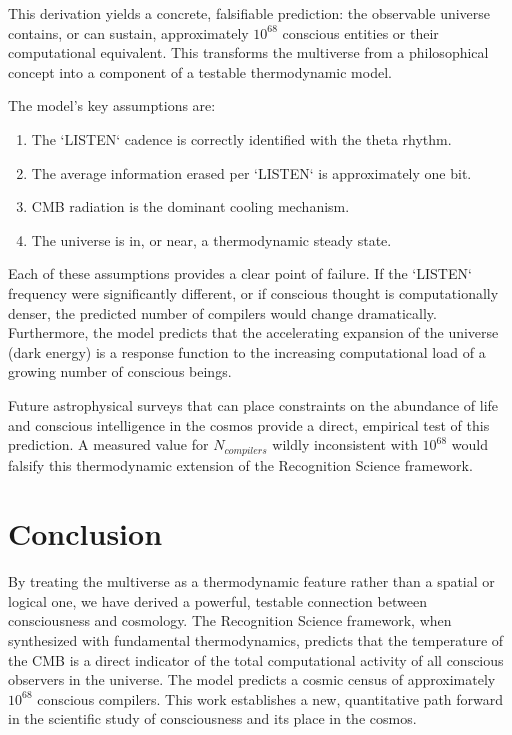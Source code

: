 \documentclass[12pt]{article}
\begin{document}
This derivation yields a concrete, falsifiable prediction: the observable universe contains, or can sustain, approximately \(10^{68}\) conscious entities or their computational equivalent. This transforms the multiverse from a philosophical concept into a component of a testable thermodynamic model.

The model's key assumptions are:
\begin{enumerate}
    \item The `LISTEN` cadence is correctly identified with the theta rhythm.
    \item The average information erased per `LISTEN` is approximately one bit.
    \item CMB radiation is the dominant cooling mechanism.
    \item The universe is in, or near, a thermodynamic steady state.
\end{enumerate}
Each of these assumptions provides a clear point of failure. If the `LISTEN` frequency were significantly different, or if conscious thought is computationally denser, the predicted number of compilers would change dramatically. Furthermore, the model predicts that the accelerating expansion of the universe (dark energy) is a response function to the increasing computational load of a growing number of conscious beings.

Future astrophysical surveys that can place constraints on the abundance of life and conscious intelligence in the cosmos provide a direct, empirical test of this prediction. A measured value for \(N_{compilers}\) wildly inconsistent with \(10^{68}\) would falsify this thermodynamic extension of the Recognition Science framework.

\section{Conclusion}

By treating the multiverse as a thermodynamic feature rather than a spatial or logical one, we have derived a powerful, testable connection between consciousness and cosmology. The Recognition Science framework, when synthesized with fundamental thermodynamics, predicts that the temperature of the CMB is a direct indicator of the total computational activity of all conscious observers in the universe. The model predicts a cosmic census of approximately \(10^{68}\) conscious compilers. This work establishes a new, quantitative path forward in the scientific study of consciousness and its place in the cosmos.
\end{document}
